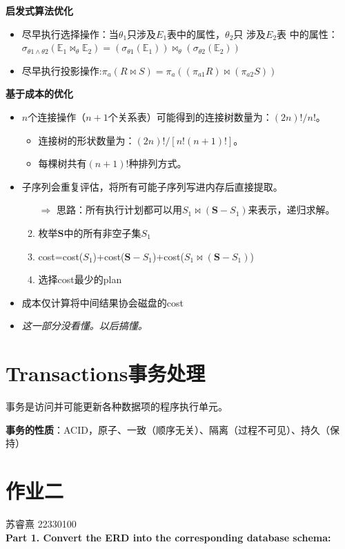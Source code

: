 \documentclass[b5paper, twoside]{article}
\let\oldtextbf\textbf
\renewcommand{\textbf}[1]{\textcolor{myblue}{\oldtextbf{#1}}}
\begin{document}
\textbf{启发式算法优化}
\begin{itemize}
	\item 尽早执行选择操作：当$ \theta _1 $只涉及$ E_1 $表中的属性，$ \theta _2 $只
	涉及$ E_2 $表
	中的属性：\\
	$\sigma_{\theta1\wedge\theta2}(\mathbb{E}_1\Join_\theta\mathbb{E}_2)=(\sigma_{\theta1}(\mathbb{E}_1))\Join_\theta(\sigma_{\theta2}(\mathbb{E}_2))$
	
	\item 尽早执行投影操作:$ \pi_a(R \Join S) = \pi_a((\pi_{a1} R) \Join 
	(\pi_{a2} S)) $
\end{itemize}

\textbf{基于成本的优化}
\begin{itemize}
	\item $ n $个连接操作（$ n+1 $个关系表）可能得到的连接树数量为：$ (2n)!/n! $。
	\begin{itemize}
		\item 连接树的形状数量为：$ (2n)!/[n!(n+1)!] $。
		\item 每棵树共有$ (n+1)! $种排列方式。
	\end{itemize}
	\item 子序列会重复评估，将所有可能子序列写进内存后直接提取。
	\begin{enumerate}
		\item[$\Rightarrow$] 思路：所有执行计划都可以用$ S_1\Join(\mathbf{S}-S_1) 
		$来表示，递归求解。
		\item 枚举$ \mathbf{S} $中的所有非空子集$ S_1 $
		\item cost=cost($ S_1 $)+cost($ \mathbf{S}-S_1 $)+cost($ 
		S_1\Join(\mathbf{S}-S_1) $)
		\item 选择cost最少的plan
	\end{enumerate}
	\item 成本仅计算将中间结果协会磁盘的cost
	\item \textit{这一部分没看懂。以后搞懂。}
\end{itemize}

\section{Transactions事务处理}
事务是访问并可能更新各种数据项的程序执行单元。

\textbf{事务的性质}：ACID，原子、一致（顺序无关）、隔离（过程不可见）、持久（保持）

\newpage
\tableofcontents
\label{toc}
\appendix
\newpage

\section{作业二}
苏睿熹 22330100\\
\textbf{Part 1. Convert the ERD into the corresponding database schema:}
\end{document}
